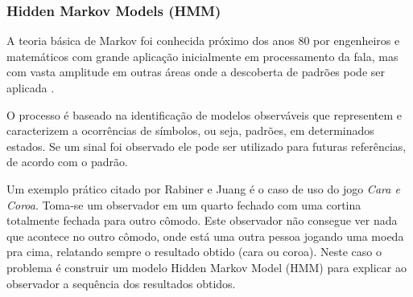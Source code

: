 
\subsubsection{Hidden Markov Models (HMM)}
\label{sssec:hmm}

A teoria básica de Markov foi conhecida próximo dos anos 80 por engenheiros e matemáticos com grande aplicação inicialmente em processamento da fala, mas com vasta amplitude em outras áreas onde a descoberta de padrões pode ser aplicada \cite{Rabiner-HMM}.

O processo é baseado na identificação de modelos observáveis que representem e caracterizem a ocorrências de símbolos, ou seja, padrões, em determinados estados. Se um sinal foi observado ele pode ser utilizado para futuras referências, de acordo com o padrão. 

Um exemplo prático citado por Rabiner e Juang \cite{Rabiner-HMM} é o caso de uso do jogo  \textit{Cara e Coroa}. Toma-se um observador em um quarto fechado com uma cortina totalmente fechada para outro cômodo. Este observador não consegue ver nada que acontece no outro cômodo, onde está uma outra pessoa jogando uma moeda pra cima, relatando sempre o resultado obtido (cara ou coroa). Neste caso o problema é construir um modelo Hidden Markov Model (HMM) para explicar ao observador a sequência dos resultados obtidos. 

